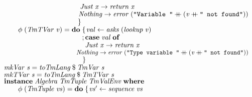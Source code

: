 \documentclass[10pt]{article}
\newcommand{\Conid}[1]{\mathit{#1}}
\newcommand{\Varid}[1]{\mathit{#1}}
\newcommand{\plus}{\mathbin{+\!\!\!+}}
\begin{document}
\begin{tabbing}
${\hskip1.00em\relax\hskip2.00em\relax\phantom{\Varid{\phi}\;(\Conid{TmVar}\;\Varid{v})\mathrel{=}\mathbf{do}\;\mbox{}}\phantom{;\mbox{}}\Conid{Just}\;\Varid{x}\to \Varid{return}\;\Varid{x}}$\\
${\hskip1.00em\relax\hskip2.00em\relax\phantom{\Varid{\phi}\;(\Conid{TmVar}\;\Varid{v})\mathrel{=}\mathbf{do}\;\mbox{}}\phantom{;\mbox{}}\Conid{Nothing}\to \Varid{error}\;(\text{\tt \char34 Variable~\char34}\plus (\Varid{v}\plus \text{\tt \char34 ~not~found\char34}))}$\\
${\hskip1.00em\relax\hskip2.00em\relax\phantom{\Varid{\phi}\;(\Conid{TmVar}\;\Varid{v})\mathrel{=}\mathbf{do}\;\mbox{}}\mskip1.5mu\}}$\\
${}$\\
${\hskip1.00em\relax\hskip2.00em\relax\Varid{\phi}\;(\Conid{TmTVar}\;\Varid{v})\mathrel{=}\mathbf{do}\;\{\mskip1.5mu \Varid{val}\leftarrow \Varid{asks}\;(\Varid{lookup}\;\Varid{v})}$\\
${\hskip1.00em\relax\hskip2.00em\relax\phantom{\Varid{\phi}\;(\Conid{TmTVar}\;\Varid{v})\mathrel{=}\mathbf{do}\;\mbox{}};\mathbf{case}\;\Varid{val}\;\mathbf{of}}$\\
${\hskip1.00em\relax\hskip2.00em\relax\phantom{\Varid{\phi}\;(\Conid{TmTVar}\;\Varid{v})\mathrel{=}\mathbf{do}\;\mbox{}}\phantom{;\mbox{}}\Conid{Just}\;\Varid{x}\to \Varid{return}\;\Varid{x}}$\\
${\hskip1.00em\relax\hskip2.00em\relax\phantom{\Varid{\phi}\;(\Conid{TmTVar}\;\Varid{v})\mathrel{=}\mathbf{do}\;\mbox{}}\phantom{;\mbox{}}\Conid{Nothing}\to \Varid{error}\;(\text{\tt \char34 Type~variable~\char34}\plus (\Varid{v}\plus \text{\tt \char34 ~not~found\char34}))}$\\
${\hskip1.00em\relax\hskip2.00em\relax\phantom{\Varid{\phi}\;(\Conid{TmTVar}\;\Varid{v})\mathrel{=}\mathbf{do}\;\mbox{}}\mskip1.5mu\}}$\\
${}$\\
${\hskip1.00em\relax\Varid{mkVar}\;\Varid{s}\mathrel{=}\Varid{toTmLang}\mathbin{\$}\Conid{TmVar}\;\Varid{s}}$\\
${\hskip1.00em\relax\Varid{mkTVar}\;\Varid{s}\mathrel{=}\Varid{toTmLang}\mathbin{\$}\Conid{TmTVar}\;\Varid{s}}$\\
${}$\\
${\hskip1.00em\relax\mathbf{instance}\;\Conid{Algebra}\;\Conid{TmTuple}\;\Conid{TmValEnv}\;\mathbf{where}}$\\
${\hskip1.00em\relax\hskip2.00em\relax\Varid{\phi}\;(\Conid{TmTuple}\;\Varid{vs})\mathrel{=}\mathbf{do}\;\{\mskip1.5mu \Varid{vs'}\leftarrow \Varid{sequence}\;\Varid{vs}}$\\

\end{tabbing}
\end{document}
